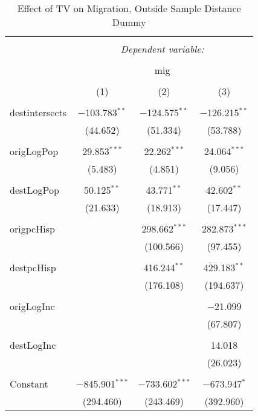 
\begin{table}[!htbp] \centering 
  \caption{Effect of TV on Migration, Outside Sample Distance Dummy} 
  \label{} 
\begin{tabular}{@{\extracolsep{5pt}}lccc} 
\\[-1.8ex]\hline 
\hline \\[-1.8ex] 
 & \multicolumn{3}{c}{\textit{Dependent variable:}} \\ 
\cline{2-4} 
\\[-1.8ex] & \multicolumn{3}{c}{mig} \\ 
\\[-1.8ex] & (1) & (2) & (3)\\ 
\hline \\[-1.8ex] 
 destintersects & $-$103.783$^{**}$ & $-$124.575$^{**}$ & $-$126.215$^{**}$ \\ 
  & (44.652) & (51.334) & (53.788) \\ 
  & & & \\ 
 origLogPop & 29.853$^{***}$ & 22.262$^{***}$ & 24.064$^{***}$ \\ 
  & (5.483) & (4.851) & (9.056) \\ 
  & & & \\ 
 destLogPop & 50.125$^{**}$ & 43.771$^{**}$ & 42.602$^{**}$ \\ 
  & (21.633) & (18.913) & (17.447) \\ 
  & & & \\ 
 origpcHisp &  & 298.662$^{***}$ & 282.873$^{***}$ \\ 
  &  & (100.566) & (97.455) \\ 
  & & & \\ 
 destpcHisp &  & 416.244$^{**}$ & 429.183$^{**}$ \\ 
  &  & (176.108) & (194.637) \\ 
  & & & \\ 
 origLogInc &  &  & $-$21.099 \\ 
  &  &  & (67.807) \\ 
  & & & \\ 
 destLogInc &  &  & 14.018 \\ 
  &  &  & (26.023) \\ 
  & & & \\ 
 Constant & $-$845.901$^{***}$ & $-$733.602$^{***}$ & $-$673.947$^{*}$ \\ 
  & (294.460) & (243.469) & (392.960) \\ 

\end{tabular}
\end{table}
